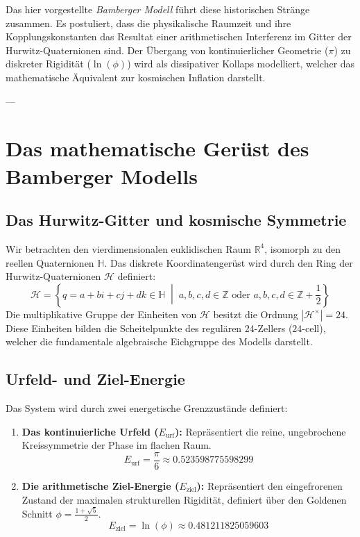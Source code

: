 \documentclass[11pt,a4paper]{article}
\begin{document}
	Das hier vorgestellte \emph{Bamberger Modell} führt diese historischen Stränge zusammen. Es postuliert, dass die physikalische Raumzeit und ihre Kopplungskonstanten das Resultat einer arithmetischen Interferenz im Gitter der Hurwitz-Quaternionen sind. Der Übergang von kontinuierlicher Geometrie ($\pi$) zu diskreter Rigidität ($\ln(\phi)$) wird als dissipativer Kollaps modelliert, welcher das mathematische Äquivalent zur kosmischen Inflation darstellt.
	
	---
	
	\section{Das mathematische Gerüst des Bamberger Modells}
	
	\subsection{Das Hurwitz-Gitter und kosmische Symmetrie}
	Wir betrachten den vierdimensionalen euklidischen Raum $\mathbb{R}^4$, isomorph zu den reellen Quaternionen $\mathbb{H}$. Das diskrete Koordinatengerüst wird durch den Ring der Hurwitz-Quaternionen $\mathcal{H}$ definiert:
	\begin{equation}
		\mathcal{H} = \left\{ q = a + bi + cj + dk \in \mathbb{H} \;\middle|\; a,b,c,d \in \mathbb{Z} \text{ oder } a,b,c,d \in \mathbb{Z} + \frac{1}{2} \right\}
	\end{equation}
	Die multiplikative Gruppe der Einheiten von $\mathcal{H}$ besitzt die Ordnung $|\mathcal{H}^\times| = 24$. Diese Einheiten bilden die Scheitelpunkte des regulären 24-Zellers ($24$-cell), welcher die fundamentale algebraische Eichgruppe des Modells darstellt.
	
	\subsection{Urfeld- und Ziel-Energie}
	Das System wird durch zwei energetische Grenzzustände definiert:
	\begin{enumerate}
		\item \textbf{Das kontinuierliche Urfeld ($E_{\text{urf}}$):} Repräsentiert die reine, ungebrochene Kreissymmetrie der Phase im flachen Raum.
		\begin{equation}
			E_{\text{urf}} = \frac{\pi}{6} \approx 0.523598775598299
		\end{equation}
		\item \textbf{Die arithmetische Ziel-Energie ($E_{\text{ziel}}$):} Repräsentiert den eingefrorenen Zustand der maximalen strukturellen Rigidität, definiert über den Goldenen Schnitt $\phi = \frac{1+\sqrt{5}}{2}$.
		\begin{equation}
			E_{\text{ziel}} = \ln(\phi) \approx 0.481211825059603
		\end{equation}
	\end{enumerate}
	
\end{document}
